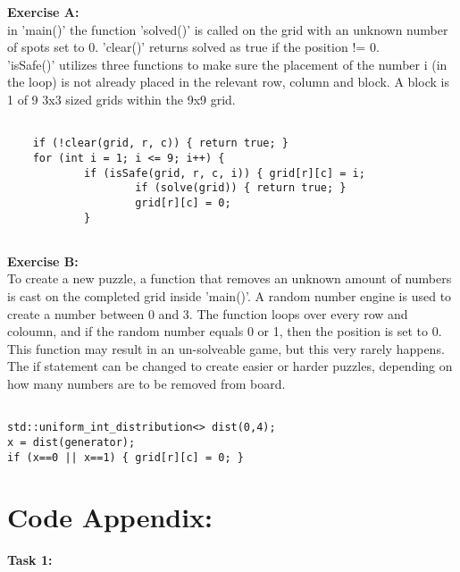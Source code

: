 \documentclass[11pt]{amsart}
\begin{document}
\textbf{Exercise A:} \\

in 'main()' the function 'solved()' is called on the grid with an unknown number of
spots set to 0. 'clear()' returns solved as true if the position != 0. \\
'isSafe()' utilizes three functions to make sure the placement of the number i (in the loop) is
not already placed in the relevant row, column and block. A block is 1 of 9 3x3 sized grids within
the 9x9 grid. \\


\begin{verbatim}

	if (!clear(grid, r, c)) { return true; }
	for (int i = 1; i <= 9; i++) {
			if (isSafe(grid, r, c, i)) { grid[r][c] = i;
					if (solve(grid)) { return true; }
					grid[r][c] = 0;
			}


\end{verbatim}


\textbf{Exercise B:} \\

To create a new puzzle, a function that removes an unknown amount of numbers is
cast on the completed grid inside 'main()'. A random number engine is used to create a number
between 0 and 3. The function loops over every row and coloumn, and if the random number
equals 0 or 1, then the position is set to 0. \\
This function may result in an un-solveable game, but this very rarely happens. \\
The if statement can be changed to create easier or harder puzzles, depending on how many
numbers are to be removed from board. \\

\begin{verbatim}

std::uniform_int_distribution<> dist(0,4);
x = dist(generator);
if (x==0 || x==1) { grid[r][c] = 0; }

\end{verbatim}

\section{\textbf{Code Appendix:}}

\textbf{Task 1:}
\end{document}
